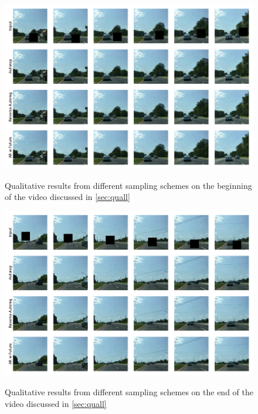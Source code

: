 \begin{figure}[h!]
\begin{center}
    \centering
    \captionsetup{type=figure}
    \includegraphics[width=\linewidth]{figures/james_quall/james_quall_beginning.pdf}
    \caption{Qualitative results from different sampling schemes on the beginning of the video discussed in \cref{sec:quall}}
    \label{fig:qual-begin}
    \includegraphics[width=\linewidth]{figures/james_quall/james_quall_end.pdf}
    \caption{Qualitative results from different sampling schemes on the end of the video discussed in \cref{sec:quall}}
    \label{fig:qual-end}
\end{center}
\end{figure}






